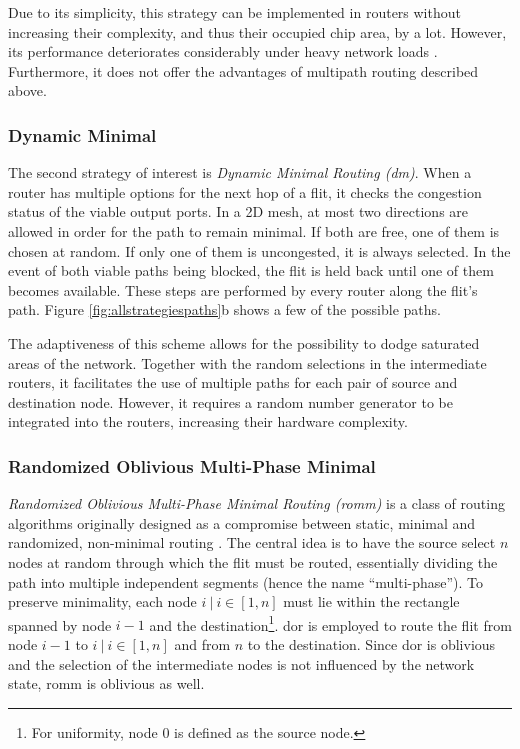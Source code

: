 Due to its simplicity, this strategy can be implemented in routers without increasing their complexity, and thus their occupied chip area, by a lot.
However, its performance deteriorates considerably under heavy network loads \cite[3]{nesson95romm}. Furthermore, it does not offer the advantages of
multipath routing described above.

\subsubsection{Dynamic Minimal}\label{subsubsec:dm}
The second strategy of interest is \textit{Dynamic Minimal Routing (\gls{dm})}. When a router has multiple options for the next hop of a flit, it checks
the congestion status of the viable output ports. In a 2D mesh, at most two directions are allowed in order for the path to remain minimal. If both
are free, one of them is chosen at random. If only one of them is uncongested, it is always selected. In the event of both viable paths being blocked,
the flit is held back until one of them becomes available. These steps are performed by every router along the flit's path. Figure
\ref{fig:allstrategiespaths}b shows a few of the possible paths.

The adaptiveness of this scheme allows for the possibility to dodge saturated areas of the network. Together with the random selections in the
intermediate routers, it facilitates the use of multiple paths for each pair of source and destination node. However, it requires a random number
generator to be integrated into the routers, increasing their hardware complexity.

\subsubsection{Randomized Oblivious Multi-Phase Minimal}\label{subsubsec:romm}
\textit{Randomized Oblivious Multi-Phase Minimal Routing (\gls{romm})} is a class of routing algorithms originally designed as a compromise between
static, minimal and randomized, non-minimal routing \cite[3]{nesson95romm}. The central idea is to have the source select $n$ nodes at random
through which the flit must be routed, essentially dividing the path into multiple independent segments (hence the name \enquote{multi-phase}). To
preserve minimality, each node $i\ |\ i \in [1,n]$ must lie within the rectangle spanned by node $i-1$ and the destination\footnote{For uniformity,
node $0$ is defined as the source node.}. \Gls{dor} is employed to route the flit from node $i-1$ to $i\ |\ i \in [1,n]$ and from $n$ to the
destination. Since \gls{dor} is oblivious and the selection of the intermediate nodes is not influenced by the network state, \gls{romm} is oblivious
as well.


